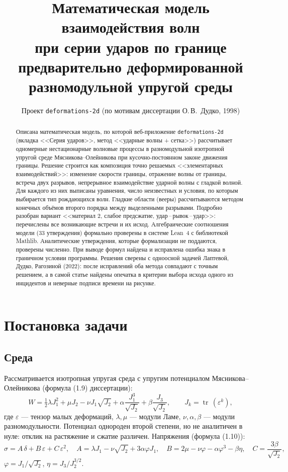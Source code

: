 \documentclass[11pt,a4paper]{article}
\title{Математическая модель взаимодействия волн\\ при серии ударов по границе\\ предварительно деформированной разномодульной упругой среды}
\author{Проект \texttt{deformations-2d} (по мотивам диссертации О.\,В.~Дудко, 1998)}
\date{}
\theoremstyle{definition}
\theoremstyle{remark}
\begin{document}
\maketitle

\begin{abstract}
Описана математическая модель, по которой веб-приложение \texttt{deformations-2d} (вкладка
<<Серия ударов>>, метод <<ударные волны + сетка>>) рассчитывает одномерные нестационарные
волновые процессы в разномодульной изотропной упругой среде Мясникова--Олейникова при
кусочно-постоянном законе движения границы. Решение строится как композиция точно решаемых
<<элементарных взаимодействий>>: изменение скорости границы, отражение волны от границы, встреча
двух разрывов, непрерывное взаимодействие ударной волны с гладкой волной. Для каждого из них
выписаны уравнения, число неизвестных и условия, по которым выбирается тип рождающихся волн.
Гладкие области (вееры) рассчитываются методом конечных объёмов второго порядка между выделенными
разрывами. Подробно разобран вариант <<материал 2, слабое предсжатие, удар\,--\,рывок\,--\,удар>>:
перечислены все возникающие встречи и их исход. Алгебраические соотношения модели (33 утверждения)
формально проверены в системе Lean~4 с библиотекой Mathlib. Аналитические утверждения, которые
формализации не поддаются, проверены численно. При выводе формул найдена и исправлена ошибка
знака в граничном условии программы. Решения сверены с одноосной задачей Лаптевой, Дудко, Рагозиной
(2022): после исправлений оба метода совпадают с точным решением, а в самой статье найдены опечатка
в критерии выбора исхода одного из инцидентов и неверные подписи времени на рисунке.
\end{abstract}

\tableofcontents

\section{Постановка задачи}

\subsection{Среда}
Рассматривается изотропная упругая среда с упругим потенциалом Мясникова--Олейникова
(формула (1.9) диссертации):
\begin{equation}\label{eq:W}
W = \tfrac12\lambda J_1^2 + \mu J_2 - \nu J_1\sqrt{J_2} + \alpha\frac{J_1^3}{\sqrt{J_2}} + \beta\frac{J_3}{\sqrt{J_2}},
\qquad J_k = \operatorname{tr}\,(\varepsilon^k),
\end{equation}
где $\varepsilon$ --- тензор малых деформаций, $\lambda,\mu$ --- модули Ламе, $\nu,\alpha,\beta$
--- модули разномодульности. Потенциал однороден второй степени, но не аналитичен в нуле:
отклик на растяжение и сжатие различен. Напряжения (формула (1.10)):
\begin{equation}\label{eq:sigma}
\sigma = A\,\delta + B\,\varepsilon + C\,\varepsilon^2,\quad
A=\lambda J_1-\nu\sqrt{J_2}+3\alpha\varphi J_1,\quad
B=2\mu-\nu\varphi-\alpha\varphi^3-\beta\eta,\quad
C=\frac{3\beta}{\sqrt{J_2}},
\end{equation}
$\varphi = J_1/\sqrt{J_2}$, $\eta = J_3/J_2^{3/2}$.
\end{document}
